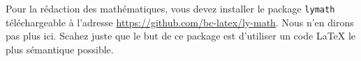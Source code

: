 Pour la rédaction des mathématiques, vous devez installer le package \verb+lymath+ téléchar\-geable à l'adresse \url{https://github.com/bc-latex/ly-math}. Nous n'en dirons pas plus ici. Scahez juste que le but de ce package est d'utiliser un code \LaTeX{} le plus sémantique possible.